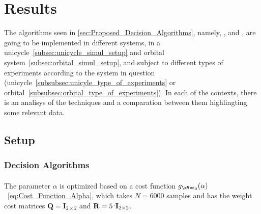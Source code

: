 
%


\chapter{Results}
\label{cha:results}

The algorithms seen in \ref{sec:Proposed_Decision_Algorithms}, namely, \label{subsec:decision_algorithms} ,  and ,  are going to be implemented in different systems, in a unicycle~\ref{subsec:unicycle_simul_setup} and orbital system~\ref{subsec:orbital_simul_setup}, and subject to different types of experiments according to the system in question (unicycle~\ref{subsubsec:unicyle_type_of_experiments} or orbital~\ref{subsubsec:orbital_type_of_experiments}). In each of the contexts, there is an analisys of the techniques and a comparation between them highlingting some relevant data.

\section{Setup}
\label{sec:setup}

\subsection{Decision Algorithms}
\label{subsec:decision_algorithms}


\subsubsection{}
\label{subsubsec:A-JO_parameters}

The parameter \(\alpha\) is optimized based on a cost function \(g_{\xVec_0}(\alpha)\)~\ref{eq:Cost_Function_Alpha}, which takes \(N=6000\) samples and has the weight cost matrices \(\mathbf{Q} = \mathbf{I}_{2\times 2} \) and \(\mathbf{R} = 5 \hspace{0.1em}^.\mathbf{I}_{2\times 2} \).\\

